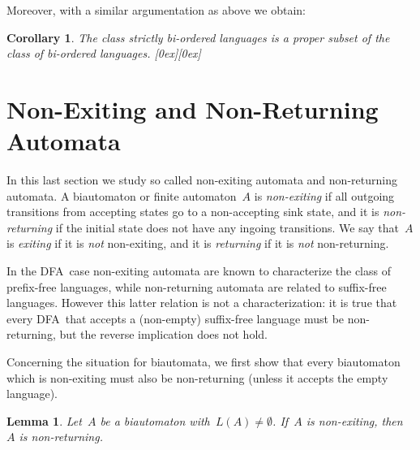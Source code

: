\documentclass[submission]{eptcs}
\newcommand{\dfa}{\textrm{DFA}}
\newcommand*{\qed}{\raisebox{0.5ex}[0ex][0ex]{\framebox[1ex][l]{}}}
\newtheorem{lemma}[theorem]{Lemma}
\newtheorem{corollary}[theorem]{Corollary}
\begin{document}
Moreover, with a similar argumentation as above we obtain:

\begin{corollary}
  The class strictly bi-ordered languages is a proper subset of the
  class of bi-ordered languages.  \hfill \qed
\end{corollary}

\section{Non-Exiting and Non-Returning Automata}
\label{sec:non-exiting-non-returning}

In this last section we study so called non-exiting automata and
non-returning automata.  
A biautomaton or finite automaton~$A$ is \emph{non-exiting} if all
outgoing transitions from accepting states go to a non-accepting sink
state, and it is \emph{non-returning} if the initial state does not
have any ingoing transitions.  We say that~$A$ is \emph{exiting} if it
is \emph{not} non-exiting, and it is \emph{returning} if it is
\emph{not} non-returning.

In the \dfa\ case non-exiting automata are known to characterize the
class of prefix-free languages, while non-returning automata are
related to suffix-free languages.  However this latter relation is not
a characterization: it is true that every \dfa\ that accepts a
(non-empty) suffix-free language must be non-returning, but the
reverse implication does not hold.

Concerning the situation for biautomata, we first show that every
biautomaton which is non-exiting must also be non-returning (unless it
accepts the empty language).

\begin{lemma}\label{lem:non-exiting-implies-non-returning}
  Let~$A$ be a biautomaton with~$L(A)\neq\emptyset$.  If~$A$ is
  non-exiting, then~$A$ is non-returning.
\end{lemma}
\end{document}
